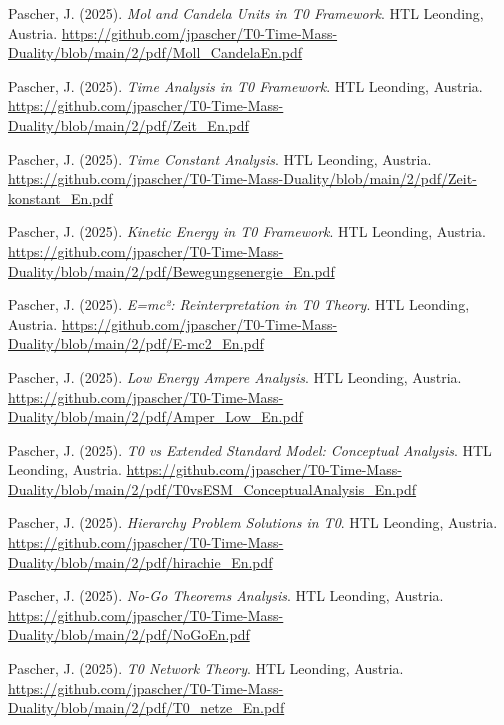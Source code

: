 \documentclass{article}
\begin{document}
\begin{thebibliography}{99}
		Pascher, J. (2025).
		\textit{Mol and Candela Units in T0 Framework}.
		HTL Leonding, Austria.
		\url{https://github.com/jpascher/T0-Time-Mass-Duality/blob/main/2/pdf/Moll_CandelaEn.pdf}
		
		
		Pascher, J. (2025).
		\textit{Time Analysis in T0 Framework}.
		HTL Leonding, Austria.
		\url{https://github.com/jpascher/T0-Time-Mass-Duality/blob/main/2/pdf/Zeit_En.pdf}
		
		Pascher, J. (2025).
		\textit{Time Constant Analysis}.
		HTL Leonding, Austria.
		\url{https://github.com/jpascher/T0-Time-Mass-Duality/blob/main/2/pdf/Zeit-konstant_En.pdf}
		
		Pascher, J. (2025).
		\textit{Kinetic Energy in T0 Framework}.
		HTL Leonding, Austria.
		\url{https://github.com/jpascher/T0-Time-Mass-Duality/blob/main/2/pdf/Bewegungsenergie_En.pdf}
		
		Pascher, J. (2025).
		\textit{E=mc²: Reinterpretation in T0 Theory}.
		HTL Leonding, Austria.
		\url{https://github.com/jpascher/T0-Time-Mass-Duality/blob/main/2/pdf/E-mc2_En.pdf}
		
		Pascher, J. (2025).
		\textit{Low Energy Ampere Analysis}.
		HTL Leonding, Austria.
		\url{https://github.com/jpascher/T0-Time-Mass-Duality/blob/main/2/pdf/Amper_Low_En.pdf}
		
		
		Pascher, J. (2025).
		\textit{T0 vs Extended Standard Model: Conceptual Analysis}.
		HTL Leonding, Austria.
		\url{https://github.com/jpascher/T0-Time-Mass-Duality/blob/main/2/pdf/T0vsESM_ConceptualAnalysis_En.pdf}
		
		Pascher, J. (2025).
		\textit{Hierarchy Problem Solutions in T0}.
		HTL Leonding, Austria.
		\url{https://github.com/jpascher/T0-Time-Mass-Duality/blob/main/2/pdf/hirachie_En.pdf}
		
		Pascher, J. (2025).
		\textit{No-Go Theorems Analysis}.
		HTL Leonding, Austria.
		\url{https://github.com/jpascher/T0-Time-Mass-Duality/blob/main/2/pdf/NoGoEn.pdf}
		
		Pascher, J. (2025).
		\textit{T0 Network Theory}.
		HTL Leonding, Austria.
		\url{https://github.com/jpascher/T0-Time-Mass-Duality/blob/main/2/pdf/T0_netze_En.pdf}
		

\end{thebibliography}
\end{document}
